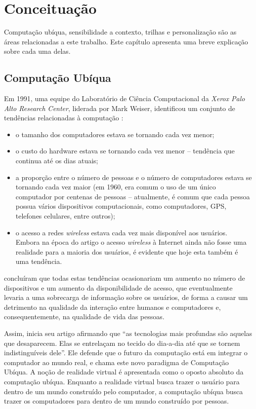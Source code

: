 \chapter{Conceituação}
\label{ch:conceitos}

Computação ubíqua, sensibilidade a contexto, trilhas e personalização são as áreas relacionadas a este trabalho. Este capítulo apresenta uma breve explicação sobre cada uma delas.


\section{Computação Ubíqua}
\label{sec:ubicomp}

Em 1991, uma equipe do Laboratório de Ciência Computacional da {\em Xerox Palo Alto Research Center}, liderada por Mark Weiser, identificou um conjunto de tendências relacionadas à computação \cite{weiser91}:

\begin{itemize}
  \item o tamanho dos computadores estava se tornando cada vez menor;
  \item o custo do hardware estava se tornando cada vez menor -- tendência que continua até os dias atuais;
  \item a proporção entre o número de pessoas e o número de computadores estava se tornando cada vez maior (em 1960, era comum o uso de um único computador por centenas de pessoas -- atualmente, é comum que cada pessoa possua vários dispositivos computacionais, como computadores, GPS, telefones celulares, entre outros);
  \item o acesso a redes {\em wireless} estava cada vez mais disponível aos usuários. Embora na época do artigo o acesso {\em wireless} à Internet ainda não fosse uma realidade para a maioria dos usuários, é evidente que hoje esta também é uma tendência.
\end{itemize}

 concluíram que todas estas tendências ocasionariam um aumento no número de dispositivos e um aumento da disponibilidade de acesso, que eventualmente levaria a uma sobrecarga de informação sobre os usuários, de forma a causar um detrimento na qualidade da interação entre humanos e computadores e, consequentemente, na qualidade de vida das pessoas.

Assim,  inicia seu artigo afirmando que ``as tecnologias mais profundas são aquelas que desaparecem. Elas se entrelaçam no tecido do dia-a-dia até que se tornem indistinguíveis dele''. Ele defende que o futuro da computação está em integrar o computador ao mundo real, e chama este novo paradigma de Computação Ubíqua. A noção de realidade virtual é apresentada como o oposto absoluto da computação ubíqua. Enquanto a realidade virtual busca trazer o usuário para dentro de um mundo construído pelo computador, a computação ubíqua busca trazer os computadores para dentro de um mundo construído por pessoas.


